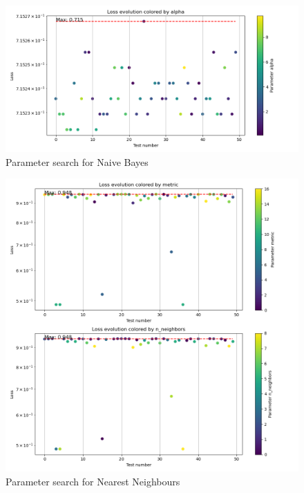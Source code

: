 \documentclass{article}
\begin{document}
\begin{figure}
    \centering
    \includegraphics{report_img/param_search/naive_bayes}
    \caption{Parameter search for Naive Bayes}
    \label{fig:}
\end{figure}

\begin{figure}
    \centering
    \includegraphics{report_img/param_search/nearest_neighbors}
    \caption{Parameter search for Nearest Neighbours}
    \label{fig:}
\end{figure}
\end{document}
